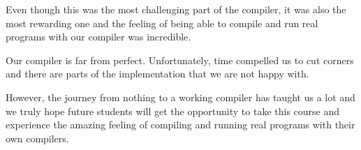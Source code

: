Even though this was the most challenging part of the compiler, it was also the most rewarding one and the feeling of being able to compile and run real programs with our compiler was incredible.

Our compiler is far from perfect. Unfortunately, time compelled us to cut corners and there are parts of the implementation that we are not happy with.

However, the journey from nothing to a working compiler has taught us a lot and we truly hope future students will get the opportunity to take this course and experience the amazing feeling of compiling and running real programs with their own compilers.

